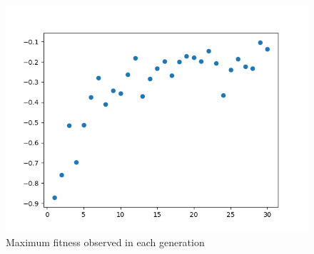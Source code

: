 \begin{figure}
    \centering
    \includegraphics[width=\linewidth]{imgs/fitness_search.png}
    \caption{Maximum fitness observed in each generation}
    \label{fig:final_pos_2}
\end{figure}
